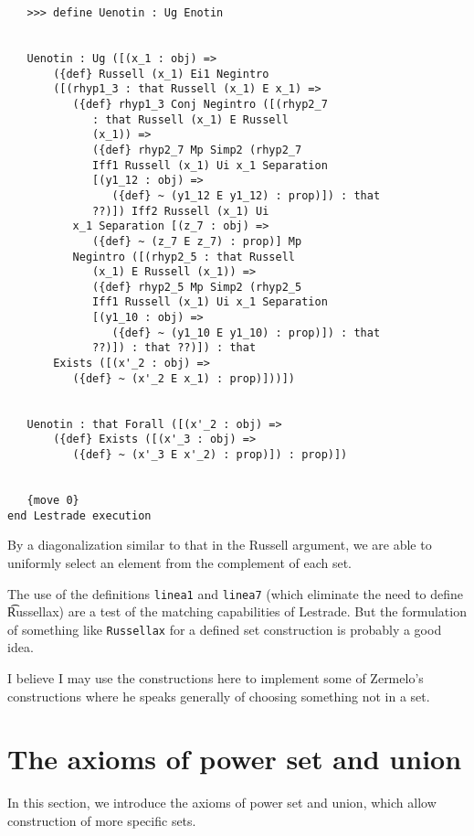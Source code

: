 \documentclass[12pt]{article}
\begin{document}
\begin{verbatim}
   >>> define Uenotin : Ug Enotin


   Uenotin : Ug ([(x_1 : obj) => 
       ({def} Russell (x_1) Ei1 Negintro 
       ([(rhyp1_3 : that Russell (x_1) E x_1) => 
          ({def} rhyp1_3 Conj Negintro ([(rhyp2_7 
             : that Russell (x_1) E Russell 
             (x_1)) => 
             ({def} rhyp2_7 Mp Simp2 (rhyp2_7 
             Iff1 Russell (x_1) Ui x_1 Separation 
             [(y1_12 : obj) => 
                ({def} ~ (y1_12 E y1_12) : prop)]) : that 
             ??)]) Iff2 Russell (x_1) Ui 
          x_1 Separation [(z_7 : obj) => 
             ({def} ~ (z_7 E z_7) : prop)] Mp 
          Negintro ([(rhyp2_5 : that Russell 
             (x_1) E Russell (x_1)) => 
             ({def} rhyp2_5 Mp Simp2 (rhyp2_5 
             Iff1 Russell (x_1) Ui x_1 Separation 
             [(y1_10 : obj) => 
                ({def} ~ (y1_10 E y1_10) : prop)]) : that 
             ??)]) : that ??)]) : that 
       Exists ([(x'_2 : obj) => 
          ({def} ~ (x'_2 E x_1) : prop)]))])


   Uenotin : that Forall ([(x'_2 : obj) => 
       ({def} Exists ([(x'_3 : obj) => 
          ({def} ~ (x'_3 E x'_2) : prop)]) : prop)])


   {move 0}
end Lestrade execution
\end{verbatim}

By a diagonalization similar to that in the Russell argument, we are able to uniformly select an element from the complement of each set.

The use of the definitions {\tt linea1} and {\tt linea7} (which eliminate the need to define {\t Russellax}) are a test of the matching capabilities of Lestrade.  But the formulation of something like {\tt Russellax} for a defined set construction is probably a good idea.

I believe I may use the constructions here to implement some of Zermelo's constructions where he speaks generally of choosing something not in a set.

\section{The axioms of power set and union}

In this section, we introduce the axioms of power set and union, which allow construction of more specific sets.
\end{document}
